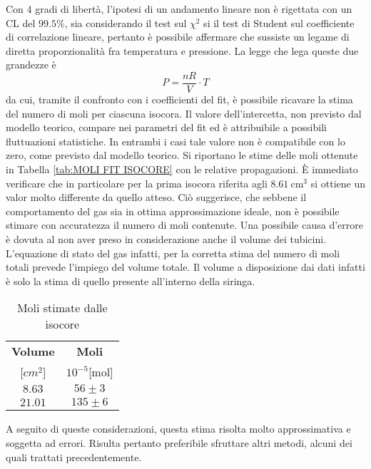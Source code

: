 \documentclass[a4paper,11pt,oneside]{article}
\begin{document}
Con 4 gradi di libertà, l'ipotesi di un andamento lineare non è rigettata con un CL del $99.5\%$, sia considerando il test sul $\chi^{2}$ si il test di Student sul coefficiente di correlazione lineare, pertanto è possibile  affermare che sussiste un legame di diretta proporzionalità fra temperatura e pressione.
La legge che lega queste due grandezze è
\begin{equation*}
    P=\frac{nR}{V}\cdot T
\end{equation*}
da cui, tramite il confronto con i coefficienti del fit, è possibile ricavare la stima del numero di moli per ciascuna isocora. Il valore dell'intercetta, non previsto dal modello teorico, compare nei parametri del fit ed è attribuibile a possibili fluttuazioni statistiche. In entrambi i casi tale valore non è compatibile con lo zero, come previsto dal modello teorico.
Si riportano le stime delle moli ottenute in Tabella \ref{tab:MOLI FIT ISOCORE} con le relative propagazioni. È immediato verificare che in particolare per la prima isocora riferita agli $\SI{8.61}{\centi\meter\cubed}$ si ottiene un valor molto differente da quello atteso. Ciò suggerisce, che sebbene il comportamento del gas sia in ottima approssimazione ideale, non è possibile stimare con accuratezza il numero di moli contenute. Una possibile causa d'errore è dovuta al non aver preso in considerazione anche il volume dei tubicini. L'equazione di stato del gas infatti, per la corretta stima del numero di moli totali prevede l'impiego del volume totale. Il volume a disposizione dai dati infatti è solo la stima di quello presente all'interno della siringa.

\begin{table}[h!]
    \centering
    \begin{tabular}{|c|c|}
        \hline
        \textbf{Volume} & \textbf{Moli} \\
        \si{[$cm^2$]} & $10^{-5}$[mol] \\ \hline
        \rowcolor[rgb]{0.85,0.85,0.85}$8.63$ & $56\pm3$\\ \hline
        $21.01$ & $135\pm6$\\ \hline
    \end{tabular}
    \caption{Moli stimate dalle isocore}
    \label{tab:moli_isocore}
\end{table}


A seguito di queste considerazioni, questa stima risolta molto approssimativa e soggetta ad errori. Risulta pertanto preferibile sfruttare altri metodi, alcuni dei quali trattati precedentemente.
\end{document}
